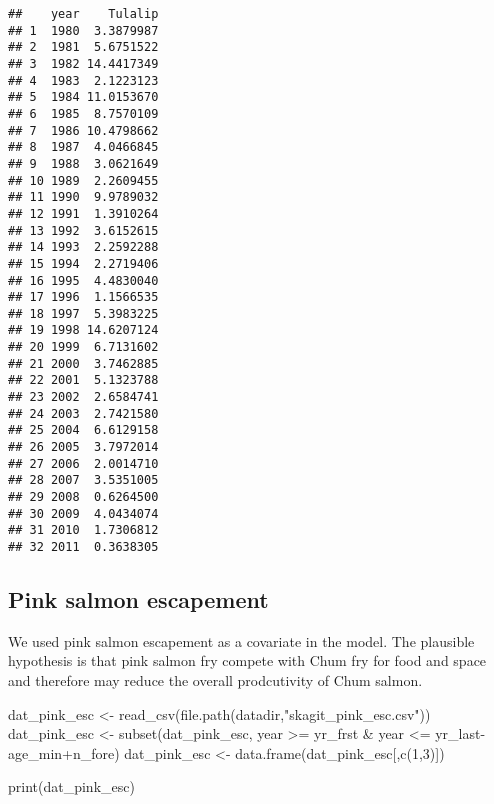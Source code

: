 \documentclass[11pt,]{article}
\newenvironment{Shaded}{}{}
\newcommand{\KeywordTok}[1]{\textcolor[rgb]{0.00,0.00,1.00}{#1}}
\newcommand{\DecValTok}[1]{#1}
\newcommand{\StringTok}[1]{\textcolor[rgb]{0.00,0.50,0.50}{#1}}
\newcommand{\OperatorTok}[1]{#1}
\newcommand{\NormalTok}[1]{#1}
\begin{document}
\begin{verbatim}
##    year    Tulalip
## 1  1980  3.3879987
## 2  1981  5.6751522
## 3  1982 14.4417349
## 4  1983  2.1223123
## 5  1984 11.0153670
## 6  1985  8.7570109
## 7  1986 10.4798662
## 8  1987  4.0466845
## 9  1988  3.0621649
## 10 1989  2.2609455
## 11 1990  9.9789032
## 12 1991  1.3910264
## 13 1992  3.6152615
## 14 1993  2.2592288
## 15 1994  2.2719406
## 16 1995  4.4830040
## 17 1996  1.1566535
## 18 1997  5.3983225
## 19 1998 14.6207124
## 20 1999  6.7131602
## 21 2000  3.7462885
## 22 2001  5.1323788
## 23 2002  2.6584741
## 24 2003  2.7421580
## 25 2004  6.6129158
## 26 2005  3.7972014
## 27 2006  2.0014710
## 28 2007  3.5351005
## 29 2008  0.6264500
## 30 2009  4.0434074
## 31 2010  1.7306812
## 32 2011  0.3638305
\end{verbatim}

\subsection{Pink salmon escapement}\label{pink-salmon-escapement}

We used pink salmon escapement as a covariate in the model. The
plausible hypothesis is that pink salmon fry compete with Chum fry for
food and space and therefore may reduce the overall prodcutivity of Chum
salmon.

\begin{Shaded}
\begin{Highlighting}[]
\NormalTok{dat_pink_esc <-}\StringTok{ }\KeywordTok{read_csv}\NormalTok{(}\KeywordTok{file.path}\NormalTok{(datadir,}\StringTok{"skagit_pink_esc.csv"}\NormalTok{))}
\NormalTok{dat_pink_esc <-}\StringTok{ }\KeywordTok{subset}\NormalTok{(dat_pink_esc, year }\OperatorTok{>=}\StringTok{ }\NormalTok{yr_frst}
                   \OperatorTok{&}\StringTok{ }\NormalTok{year }\OperatorTok{<=}\StringTok{ }\NormalTok{yr_last}\OperatorTok{-}\NormalTok{age_min}\OperatorTok{+}\NormalTok{n_fore)}
\NormalTok{dat_pink_esc <-}\StringTok{ }\KeywordTok{data.frame}\NormalTok{(dat_pink_esc[,}\KeywordTok{c}\NormalTok{(}\DecValTok{1}\NormalTok{,}\DecValTok{3}\NormalTok{)])}

\KeywordTok{print}\NormalTok{(dat_pink_esc)}
\end{Highlighting}
\end{Shaded}
\end{document}
